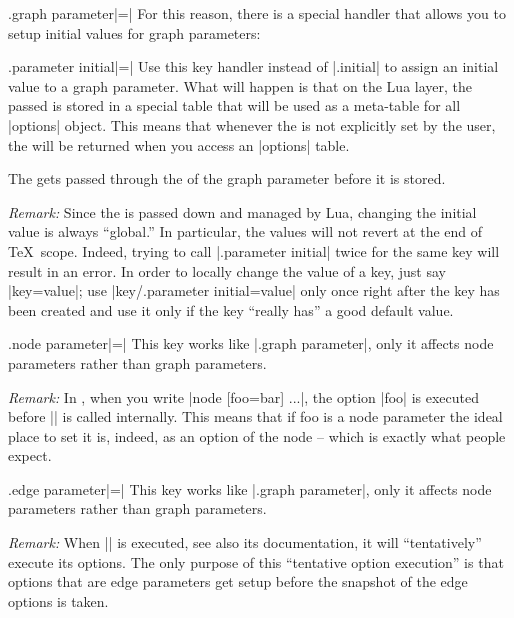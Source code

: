 \begin{handler}{{.graph parameter}|=|}
  For this reason, there is a special handler that allows you to setup
  initial values for graph parameters:
  \begin{handler}{{.parameter initial}|=|}
    Use this key handler instead of |.initial| to assign an initial value
    to a graph parameter. What will happen is that on the Lua layer,
    the passed  is stored in a special table that will be
    used as a meta-table for all |options| object. This means that
    whenever the  is not explicitly set by the user, the
     will be returned when you access an |options| table.

    The  gets passed through the  of the
    graph parameter before it is stored.

    \emph{Remark:} Since the  is passed down and managed
    by Lua, changing the initial value is always ``global.'' In
    particular, the values will not revert at the end of \TeX\
    scope. Indeed, trying to call |.parameter initial| twice for the
    same key will result in an error. In order to locally change the
    value of a key, just say |key=value|; use
    |key/.parameter initial=value| only once right after the key has
    been created and use it only if the key ``really has'' a good
    default value. 
\begin{codeexample}
\end{codeexample}
  \end{handler}
\end{handler}

\begin{handler}{{.node parameter}|=|}
  This key works like |.graph parameter|, only it
  affects node parameters rather than graph parameters.

  \emph{Remark:} In \tikzname, when you write |node [foo=bar] {...}|,
  the option |foo| is executed before |\pgfnode| is called
  internally. This means that if foo is a node parameter the ideal
  place to set it is, indeed, as an option of the node -- which is
  exactly what people expect.
\end{handler}

\begin{handler}{{.edge parameter}|=|}
  This key works like |.graph parameter|, only it
  affects node parameters rather than graph parameters.

  \emph{Remark:} When |\pgfgdedge| is executed, see also its
  documentation, it will ``tentatively'' execute its options. The only
  purpose of this ``tentative option execution'' is that options that
  are edge parameters get setup before the snapshot of the edge
  options is taken.  
\end{handler}


